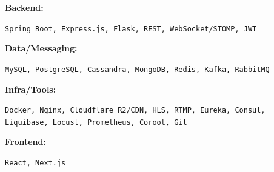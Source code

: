\documentclass[9pt]{developercv}
\begin{document}
\begin{minipage}[t]{0.2\textwidth}
    \textbf{Backend:}
\end{minipage}
\hfill
\begin{minipage}[t]{0.8\textwidth}
  {\large \texttt{Spring Boot, Express.js, Flask, REST, WebSocket/STOMP, JWT}}
\end{minipage}

\begin{minipage}[t]{0.2\textwidth}
    \textbf{Data/Messaging:}
\end{minipage}
\hfill
\begin{minipage}[t]{0.8\textwidth}
  {\large \texttt{MySQL, PostgreSQL, Cassandra, MongoDB, Redis, Kafka, RabbitMQ}}
\end{minipage}

\begin{minipage}[t]{0.2\textwidth}
    \textbf{Infra/Tools:}
\end{minipage}
\hfill
\begin{minipage}[t]{0.8\textwidth}
  {\large \texttt{Docker, Nginx, Cloudflare R2/CDN, HLS, RTMP, Eureka, Consul, Liquibase, Locust, Prometheus, Coroot, Git}}
\end{minipage}

\begin{minipage}[t]{0.2\textwidth}
    \textbf{Frontend:}
\end{minipage}
\hfill
\begin{minipage}[t]{0.8\textwidth}
  {\large \texttt{React, Next.js}}
\end{minipage}
\end{document}
